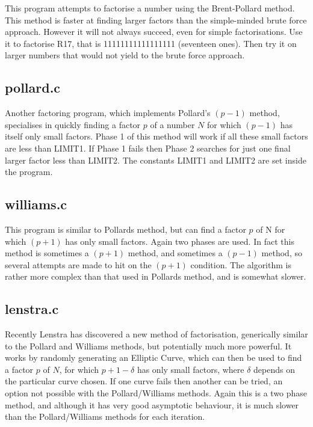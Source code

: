       This program attempts to factorise a number using  the  Brent-Pollard 
      method.  This  method  is  faster  at finding larger factors than the 
      simple-minded brute  force  approach.  However  it  will  not  always 
      succeed,  even  for simple factorisations.  Use it to factorise 
      R17, that is 11111111111111111 (seventeen ones). Then try it on larger
      numbers that would not yield to the brute force approach.  


      \subsection{pollard.c}

      Another factoring program, which implements Pollard's $(p-1)$ method,  
      specialises in quickly finding a factor $p$ of  a number  $N$ for  which
      $(p-1)$ has itself only small factors. Phase 1 of this method will work
      if all these small factors are less  than  LIMIT1. If  Phase 1  fails 
      then Phase 2 searches for just one  final  larger factor less  than
      LIMIT2. The constants LIMIT1 and LIMIT2 are set inside the program. 


      \subsection{williams.c}

      This program is similar to Pollards method, but can find a factor $p$ 
      of N for which $(p+1)$ has only small factors. Again two phases are 
      used. In fact this method is sometimes a $(p+1)$ method, and sometimes 
      a $(p-1)$ method, so several attempts are made to hit on the $(p+1)$ 
      condition. The algorithm is rather more complex than that used in 
      Pollards method, and is somewhat slower. 


      \subsection{lenstra.c}

      Recently Lenstra \cite{Monty} has discovered a new method of factorisation, 
      generically similar to the Pollard and Williams methods, but 
      potentially much more powerful. It works by randomly generating an 
      Elliptic Curve, which can then be used to find a factor $p$ of $N$, for 
      which $p+1-\delta$ has only small factors, where $\delta$ depends on the particular 
      curve chosen. If one curve fails then another can be tried, an option 
      not possible with the Pollard/Williams methods. Again this is a two 
      phase method, and although it has very good asymptotic behaviour, it 
      is much slower than the Pollard/Williams methods for each iteration. 

